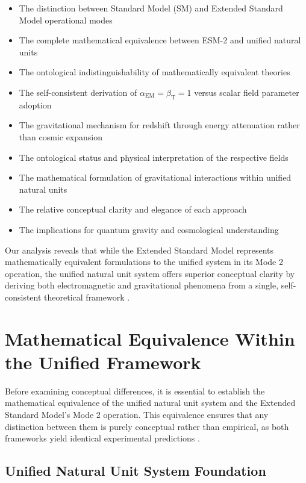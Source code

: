 \documentclass[12pt,a4paper]{article}
\newcommand{\alphaEM}{\alpha_{\text{EM}}}
\newcommand{\betaT}{\beta_{\text{T}}}
\begin{document}
	\begin{itemize}
		\item The distinction between Standard Model (SM) and Extended Standard Model operational modes
		\item The complete mathematical equivalence between ESM-2 and unified natural units
		\item The ontological indistinguishability of mathematically equivalent theories
		\item The self-consistent derivation of $\alphaEM = \betaT = 1$ versus scalar field parameter adoption
		\item The gravitational mechanism for redshift through energy attenuation rather than cosmic expansion \cite{Adams1925,Pound1960}
		\item The ontological status and physical interpretation of the respective fields
		\item The mathematical formulation of gravitational interactions within unified natural units \cite{pascher_lagrangian_2025}
		\item The relative conceptual clarity and elegance of each approach
		\item The implications for quantum gravity and cosmological understanding
	\end{itemize}
	
	Our analysis reveals that while the Extended Standard Model represents mathematically equivalent formulations to the unified system in its Mode 2 operation, the unified natural unit system offers superior conceptual clarity by deriving both electromagnetic and gravitational phenomena from a single, self-consistent theoretical framework \cite{pascher_pragmatic_2025}.
	
	\section{Mathematical Equivalence Within the Unified Framework}
	\label{sec:mathematical_equivalence}
	
	Before examining conceptual differences, it is essential to establish the mathematical equivalence of the unified natural unit system and the Extended Standard Model's Mode 2 operation. This equivalence ensures that any distinction between them is purely conceptual rather than empirical, as both frameworks yield identical experimental predictions \cite{pascher_unified_2025}.
	
	\subsection{Unified Natural Unit System Foundation}
	\label{subsec:unified_foundation}
	
\end{document}
